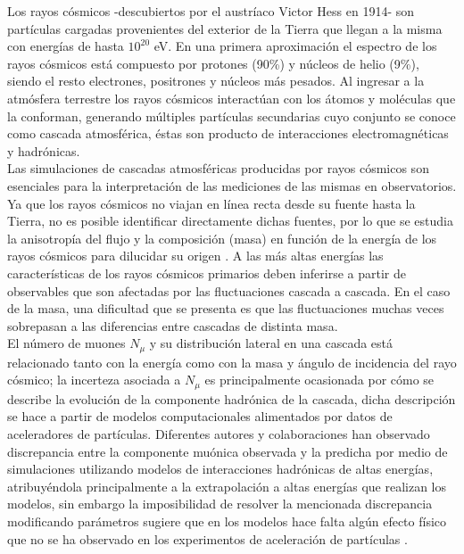 
Los rayos cósmicos -descubiertos por el austríaco Victor Hess en 1914- son partículas cargadas provenientes del exterior de la Tierra que llegan a la misma con energías de hasta $10^{20}$ eV. En una primera aproximaci\'on el espectro de los rayos c\'osmicos est\'a compuesto por protones (90\%) y núcleos de helio (9\%), siendo el resto electrones, positrones y núcleos más pesados. Al ingresar a la atmósfera terrestre los rayos c\'osmicos interactúan con los átomos y moléculas que la conforman, generando m\'ultiples partículas secundarias cuyo conjunto se conoce como cascada atmosf\'erica, éstas son producto de interacciones electromagnéticas y hadrónicas. \\

Las simulaciones de cascadas atmosf\'ericas producidas por rayos c\'osmicos son esenciales para la interpretaci\'on de las mediciones de las mismas en observatorios. Ya que los rayos c\'osmicos no viajan en l\'inea recta desde su fuente hasta la Tierra, no es posible identificar directamente dichas fuentes, por lo que se estudia la anisotrop\'ia del flujo y la composici\'on (masa) en funci\'on de la energ\'ia de los rayos c\'osmicos para dilucidar su origen \cite{Albrecht2021}. A las m\'as altas energ\'ias las caracter\'isticas de los rayos c\'osmicos primarios deben inferirse a partir de observables que son afectadas por las fluctuaciones cascada a cascada. En el caso de la masa, una dificultad que se presenta es que las fluctuaciones muchas veces sobrepasan a las diferencias entre cascadas de distinta masa. \\

El n\'umero de muones $N_{\mu}$ y su distribuci\'on lateral en una cascada est\'a relacionado tanto con la energ\'ia como con la masa y \'angulo de incidencia del rayo c\'osmico; la incerteza asociada a $N_{\mu}$ es principalmente ocasionada por c\'omo se describe la evoluci\'on de la componente hadr\'onica de la cascada, dicha descripci\'on se hace a partir de modelos computacionales alimentados por datos de aceleradores de part\'iculas. Diferentes autores y colaboraciones han observado discrepancia entre la componente mu\'onica observada y la predicha por medio de simulaciones utilizando modelos de interacciones hadr\'onicas de altas energ\'ias, atribuy\'endola principalmente a la extrapolaci\'on a altas energ\'ias que realizan los modelos, sin embargo la imposibilidad de resolver la mencionada discrepancia modificando par\'ametros sugiere que en los modelos hace falta alg\'un efecto f\'isico que no se ha observado en los experimentos de aceleraci\'on de part\'iculas \cite{Albrecht2021}. \\

